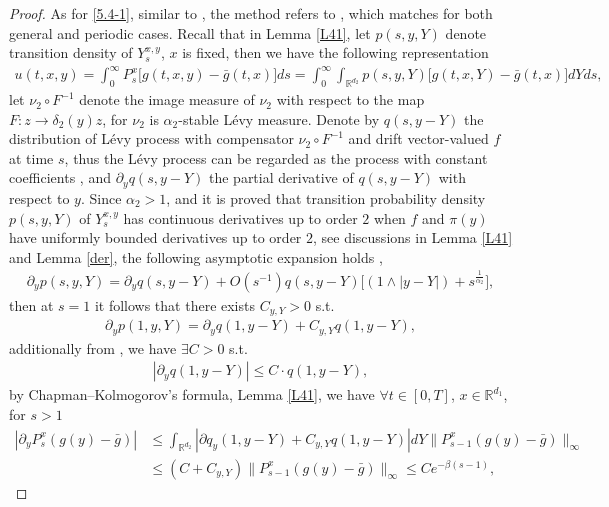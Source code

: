 \documentclass[11pt,reqno]{amsart}
\numberwithin{equation}{section}
\newcommand{\R}{\mathbb{R}}
\newcommand{\al}{\alpha}
\newcommand{\de}{\delta}
\newcommand{\mb}{\mathbb}
\begin{document}
\begin{proof}
	\iffalse
As for \eqref{5.4-1}, similar to \cite[Proposition 3]{BF}, the method refers to
\cite[743, Theorem 3.1]{VK}, which matches for both general and periodic cases. Recall that in Lemma \ref{L41}, let $p(s,y,Y)$ denote transition density of $Y_{s}^{x,y}$, $x$ is fixed, then we have the following representation 
\begin{align*}
u(t,x,y)=\int_{0}^{\infty}P^{x}_{s}\big[g(t,x,y)-\bar{g}(t,x)\big]ds=\int_{0}^{\infty}\int_{\R^{d_{2}}}p(s,y,Y)\big[g(t,x,Y)-\bar{g}(t,x)\big]dYds,
\end{align*}
let $\nu_{2}\circ F^{-1}$ denote the image measure of $\nu_{2}$ with respect to the map $F:z\rightarrow\de_2(y)z$, for $\nu_{2}$ is $\al_2$-stable L\'evy measure.  Denote by $q(s,y-Y)$ the distribution
of L\'{e}vy process with compensator $\nu_{2}\circ F^{-1}$ and drift vector-valued $f$ at time $s$, thus  the L\'{e}vy process can be regarded as the process with constant coefficients \cite[739, Proposition 3.1]{VK}, and $\partial_{y}q(s,y-Y)$ the partial derivative of $q(s,y-Y)$ with respect to $y$. Since $\al_{2}>1$, and it is proved that transition probability density $p(s,y,Y)$ of $Y_{s}^{x,y}$ has continuous derivatives up to order $2$ when $f$ and $\pi(y)$ have uniformly bounded derivatives up to order $2$, see discussions in Lemma \ref{L41} and Lemma \ref{der}, 
the following asymptotic expansion holds \cite[743, Theorem 3.1]{VK},
\begin{align}\label{asy}
\partial_y p(s, y, Y)=\partial_y q(s, y-Y)+O(s^{-1})q(s, y-Y)\big[(1\wedge |y-Y|)+s^{\frac{1}{\al_{2}}}\big],
\end{align}
then at $s=1$ it follows that there exists $C_{y,Y}>0$ s.t.
\begin{align*}
	\partial_y p(1, y, Y)=\partial_y q(1, y-Y)+C_{y,Y}q(1, y-Y),
\end{align*}
additionally from \cite[739, Proposition 3.1]{VK}, we have $\exists C>0$ s.t.
\begin{align}\label{part-q}
	\left|\partial_y q(1, y-Y)\right| \leq C\cdot q(1, y-Y),
\end{align}
by Chapman–Kolmogorov’s formula, Lemma \ref{L41}, we have $\forall t\in [0,T]$, $x\in \mb{R}^{d_1}$, for $s>1$ 
\begin{align}
	\left|\partial_{y}P_{s}^{x}\left(g(y)-\bar{g}\right) \right| &\leq \int_{\R^{d_{2}}}\left|\partial q_y(1, y-Y)+C_{y,Y}q(1, y-Y) \right| dY\| P_{s-1}^{x}\left(g(y)-\bar{g}\right)\|_{\infty}\nonumber\\
	&\leq(C+C_{y,Y})\| P_{s-1}^{x}\left(g(y)-\bar{g}\right)\|_{\infty}\leq  Ce^{-\beta (s-1)},\label{s>1}

\end{align}
\end{proof}
\end{document}
